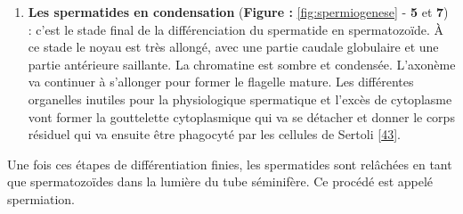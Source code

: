 \documentclass[12pt,a4paper,twoside]{ugathesis}
\providecommand{\tightlist}{%
  \setlength{\itemsep}{0pt}\setlength{\parskip}{0pt}}
\theoremstyle{definition}
\theoremstyle{definition}
\theoremstyle{definition}
\theoremstyle{remark}
\begin{document}
\begin{enumerate}
\def\labelenumi{\arabic{enumi}.}
\setcounter{enumi}{2}
\tightlist
\item
  \textbf{Les spermatides en condensation} (\textbf{Figure :
  }\ref{fig:spermiogenese} - \textbf{5} et \textbf{7}) : c'est le stade
  final de la différenciation du spermatide en spermatozoïde. À ce stade
  le noyau est très allongé, avec une partie caudale globulaire et une
  partie antérieure saillante. La chromatine est sombre et condensée.
  L'axonème va continuer à s'allonger pour former le flagelle mature.
  Les différentes organelles inutiles pour la physiologique spermatique
  et l'excès de cytoplasme vont former la gouttelette cytoplasmique qui
  va se détacher et donner le corps résiduel qui va ensuite être
  phagocyté par les cellules de Sertoli
  {[}\protect\hyperlink{ref-Hermo2010}{43}{]}.
\end{enumerate}

Une fois ces étapes de différentiation finies, les spermatides sont
relâchées en tant que spermatozoïdes dans la lumière du tube séminifère.
Ce procédé est appelé spermiation.
\end{document}
